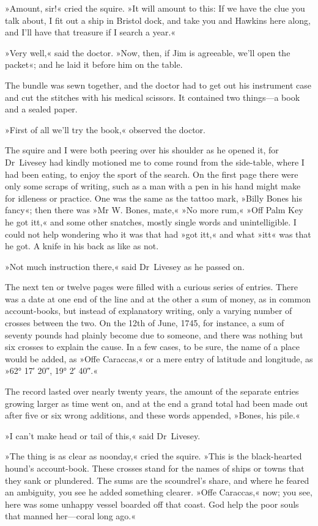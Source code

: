 »Amount, sir!« cried the squire. »It will amount to this: If we have the clue you talk about, I fit out a ship in Bristol dock, and take you and Hawkins here along, and I'll have that treasure if I search a year.«

»Very well,« said the doctor. »Now, then, if Jim is agreeable, we'll open the packet«; and he laid it before him on the table.

The bundle was sewn together, and the doctor had to get out his instrument case and cut the stitches with his medical scissors. It contained two things—a book and a sealed paper.

»First of all we'll try the book,« observed the doctor.

The squire and I were both peering over his shoulder as he opened it, for Dr~Livesey had kindly motioned me to come round from the side-table, where I had been eating, to enjoy the sport of the search. On the first page there were only some scraps of writing, such as a man with a pen in his hand might make for idleness or practice. One was the same as the tattoo mark, »Billy Bones his fancy«; then there was »Mr W. Bones, mate,« »No more rum,« »Off Palm Key he got itt,« and some other snatches, mostly single words and unintelligible. I could not help wondering who it was that had »got itt,« and what »itt« was that he got. A knife in his back as like as not.

»Not much instruction there,« said Dr~Livesey as he passed on.

The next ten or twelve pages were filled with a curious series of entries. There was a date at one end of the line and at the other a sum of money, as in common account-books, but instead of explanatory writing, only a varying number of crosses between the two. On the 12th of June, 1745, for instance, a sum of seventy pounds had plainly become due to someone, and there was nothing but six crosses to explain the cause. In a few cases, to be sure, the name of a place would be added, as »Offe Caraccas,« or a mere entry of latitude and longitude, as »62° 17′ 20″, 19° 2′ 40″.«

The record lasted over nearly twenty years, the amount of the separate entries growing larger as time went on, and at the end a grand total had been made out after five or six wrong additions, and these words appended, »Bones, his pile.«

»I can't make head or tail of this,« said Dr~Livesey.

»The thing is as clear as noonday,« cried the squire. »This is the black-hearted hound's account-book. These crosses stand for the names of ships or towns that they sank or plundered. The sums are the scoundrel's share, and where he feared an ambiguity, you see he added something clearer. »Offe Caraccas,« now; you see, here was some unhappy vessel boarded off that coast. God help the poor souls that manned her—coral long ago.«

